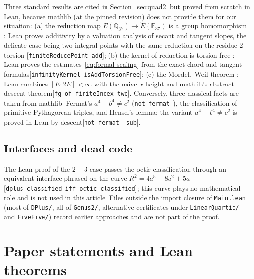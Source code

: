 \documentclass[10pt]{article}
\theoremstyle{definition}
\theoremstyle{remark}
\newcommand{\Q}{\mathbb{Q}}
\newcommand{\F}{\mathbb{F}}
\newcommand{\leanref}[1]{{\scriptsize\textup{[\texttt{#1}]}}\allowbreak}
\begin{document}
Three standard results are cited in Section~\ref{sec:quad2} but proved from
scratch in Lean, because mathlib (at the pinned revision) does not provide
them for our situation:
(a) the reduction map $E(\Q_{37})\to\tilde E(\F_{37})$ is a group
homomorphism \cite[VII.2.1]{Silverman}: Lean proves additivity by a valuation
analysis of secant and tangent slopes, the delicate case being two integral
points with the same reduction on the residue $2$-torsion
\leanref{finite\allowbreak Reduce\allowbreak Point\_\allowbreak add};
(b) the kernel of reduction is torsion-free \cite[IV.6.1, VII.3.1]{Silverman}:
Lean proves the estimates~\eqref{eq:formal-scaling} from the exact chord and
tangent formulas\leanref{infinity\allowbreak Kernel\_\allowbreak is\allowbreak Add\allowbreak Torsion\allowbreak Free};
(c) the Mordell--Weil theorem \cite[VIII.6.7]{Silverman}: Lean combines
$[E:2E]<\infty$ with the naive $x$-height and mathlib's abstract descent
theorem\leanref{fg\_\allowbreak of\_\allowbreak finite\allowbreak Index\_\allowbreak two}.
Conversely, three classical facts are taken from mathlib: Fermat's
$a^4+b^4\ne c^2$ (\texttt{not\_\allowbreak fermat\_}), the classification of primitive
Pythagorean triples, and Hensel's lemma; the variant $a^4-b^4\ne c^2$ is
proved in Lean by descent\leanref{not\_\allowbreak fermat\_\_\allowbreak sub}.

\subsection{Interfaces and dead code}

The Lean proof of the $2+3$ case passes the octic classification through an
equivalent interface phrased on the curve $R^2=4a^5-8a^2+5a$
\leanref{dplus\_\allowbreak classified\_\allowbreak iff\_\allowbreak octic\_\allowbreak classified}; this curve plays no
mathematical role and is not used in this article.  Files outside the
import closure of \texttt{Main.\allowbreak lean} (most of \texttt{DPlus/\allowbreak }, all of
\texttt{Genus2/\allowbreak }, alternative certificates under \texttt{Linear\allowbreak Quartic/\allowbreak } and
\texttt{Five\allowbreak Five/\allowbreak }) record earlier approaches and are not part of the proof.

\clearpage
\appendix

\section{Paper statements and Lean theorems}\label{app:table}
\end{document}
